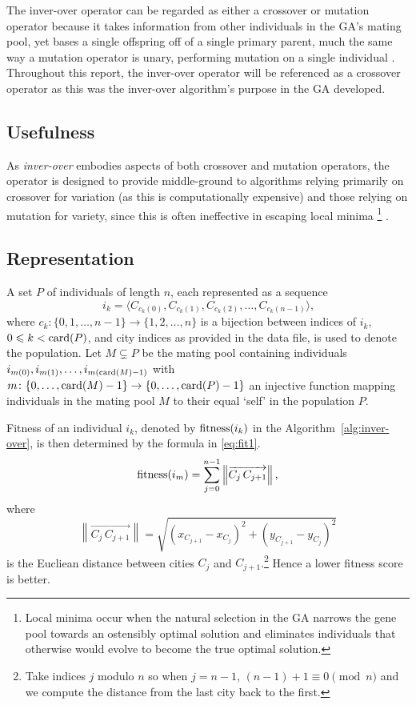 The inver-over operator can be regarded as either a crossover or mutation 
operator because it takes information from other individuals in the GA's
mating pool, yet bases a single offspring off of a single primary parent, much 
the same way a mutation operator is unary, performing mutation on a single
individual \cite{p44}. Throughout this report, the inver-over operator will 
be referenced as a crossover operator as this was the inver-over 
algorithm's purpose in the GA developed.

\subsection{Usefulness}
As {\em inver-over} embodies aspects of both crossover and mutation 
operators, the operator  is designed to provide middle-ground to 
algorithms relying primarily on crossover for variation (as this is 
computationally expensive) and those relying on mutation for variety,
since this is often ineffective in escaping local minima%
\footnote{Local minima occur when the natural selection in the GA 
	narrows the gene pool towards an ostensibly optimal solution and 
	eliminates individuals that otherwise would evolve to become the 
	true optimal solution.} \cite{p44}.


\subsection{Representation}
A set $P$ of individuals of length $n$, each represented as a sequence
\begin{equation*}
i_k = \langle C_{c_k(0)}, C_{c_k(1)}, C_{c_k(2)}, \ldots, C_{c_k(n-1)} \rangle\text{,}
\end{equation*}
where $c_k\colon \{0, 1, \ldots, n-1\} \to \{ 1, 2, \ldots, n \}$ is a bijection 
between indices of $i_k$, $0 \leqslant k < \operatorname{card}(P)$, and city indices as 
provided in the data file, is used to denote the population. Let 
$M \subsetneq P$ be the mating pool containing individuals 
$i_{m(0)}, i_{m(1)},\ldots, i_{m(\operatorname{card}(M)-1)}$ with $m\colon 
\{0, \ldots, \operatorname{card}(M)-1\} \to \{0, \ldots, \operatorname{card}(P) -1\}$
 an injective function mapping individuals in the mating pool $M$ to 
their equal `self' in the population $P$.

Fitness of an individual $i_k$, denoted by $\operatorname{fitness}(i_k)$ in the Algorithm~\ref{alg:inver-over}, is then determined by the formula in 
\eqref{eq:fit1}.
\begin{equation}
\operatorname{fitness}(i_m) = \sum_{j=0}^{n-1} \left\lVert \overrightarrow{C_j \, C_{j+1}} \right\rVert\text{,} \label{eq:fit1} 
\end{equation}
where 
\begin{equation*}
\left\lVert \overrightarrow{C_j \, C_{j+1}} \right\rVert = \sqrt{(x_{C_{j+1}} - x_{C_j})^2 + (y_{C_{j+1}} - y_{C_j})^2}
\end{equation*}
is the Eucliean distance between cities $C_j$ and $C_{j+1}$.\footnote{
	Take indices $j$ modulo $n$ so when $j=n-1$, $(n-1)+1  \equiv 0 \pmod n$
	 and we compute the distance from the last city back to the first.} Hence
a lower fitness score is better.

